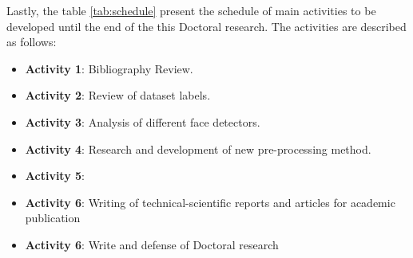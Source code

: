 

Lastly, the table \autoref{tab:schedule} present the schedule of main activities to be developed until the end of the this Doctoral research. The activities are described as follows:

\begin{itemize}
\item \textbf{Activity 1}: Bibliography Review.
\item \textbf{Activity 2}: Review of dataset labels.
\item \textbf{Activity 3}: Analysis of different face detectors.
\item \textbf{Activity 4}: Research and development of new pre-processing method.
\item \textbf{Activity 5}: 
\item \textbf{Activity 6}: Writing of technical-scientific reports and articles for academic publication
\item \textbf{Activity 6}: Write and defense of Doctoral research
\end{itemize}
